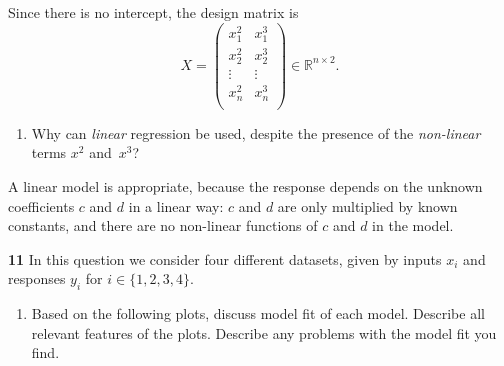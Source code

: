\documentclass[
  a4paper,
]{article}
\providecommand{\tightlist}{%
  \setlength{\itemsep}{0pt}\setlength{\parskip}{0pt}}
\theoremstyle{definition}
\theoremstyle{definition}
\theoremstyle{definition}
\theoremstyle{definition}
\theoremstyle{remark}
\begin{document}
\begin{myanswers}
Since there is no intercept, the design matrix is
\begin{equation*}
  X = \begin{pmatrix}
    x_1^2 & x_1^3 \\
    x_2^2 & x_2^3 \\
    \vdots & \vdots \\
    x_n^2 & x_n^3 \\
  \end{pmatrix}
  \in \mathbb{R}^{n\times 2}.
\end{equation*}

\end{myanswers}

\begin{enumerate}
\def\labelenumi{\alph{enumi}.}
\setcounter{enumi}{2}
\tightlist
\item
  Why can \emph{linear} regression be used, despite the presence
  of the \emph{non-linear} terms \(x^2\) and~\(x^3\)?
\end{enumerate}

\begin{myanswers}
A linear model is appropriate, because the response depends
on the unknown coefficients \(c\) and \(d\) in a linear way: \(c\) and \(d\)
are only multiplied by known constants, and there are no non-linear
functions of \(c\) and \(d\) in the model.

\end{myanswers}

\textbf{11} In this question we consider four different datasets, given by
inputs \(x_i\) and responses \(y_i\) for \(i \in \{1, 2, 3, 4\}\).

\begin{enumerate}
\def\labelenumi{\alph{enumi}.}
\tightlist
\item
  Based on the following plots, discuss model fit of each model.
  Describe all relevant features of the plots.
  Describe any problems with the model fit you find.
\end{enumerate}
\end{document}
